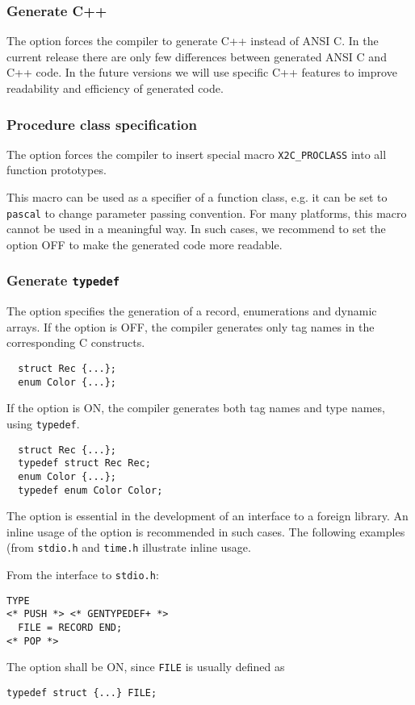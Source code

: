 \subsubsection{Generate C++}

The option  forces the compiler
to generate C++ instead of ANSI C. In the current release there are
only few differences between generated ANSI C and C++ code. In the
future versions we will use specific C++ features to improve
readability and efficiency of generated code.

\subsubsection{Procedure class specification}

The option 
forces the compiler to insert special macro \verb|X2C_PROCLASS|
into all function prototypes.

This macro can be used as a specifier of a function class, e.g. it can be set
to {\tt pascal} to change parameter passing convention.  For many
platforms, this macro cannot be used in a meaningful way. In such
cases, we recommend to set the option OFF to make the generated code
more readable.

\subsubsection{Generate {\tt typedef}}

The option 
specifies  the  generation  of a record,  enumerations and dynamic
arrays. If the option is OFF, the compiler generates only tag names
in the corresponding C constructs.
\begin{verbatim}
  struct Rec {...};
  enum Color {...};
\end{verbatim}
If the option is ON, the compiler generates both tag names
and type names, using {\tt typedef}.
\begin{verbatim}
  struct Rec {...};
  typedef struct Rec Rec;
  enum Color {...};
  typedef enum Color Color;
\end{verbatim}

The  option  is essential in the development of an interface to a foreign
library. An inline usage of the option is recommended in such cases.
The following examples (from {\tt stdio.h} and {\tt time.h}
illustrate inline usage.

From the interface to {\tt stdio.h}:
\begin{verbatim}
TYPE
<* PUSH *> <* GENTYPEDEF+ *>
  FILE = RECORD END;
<* POP *>
\end{verbatim}
The option shall be ON, since {\tt FILE} is usually defined as
\begin{verbatim}
typedef struct {...} FILE;
\end{verbatim}

